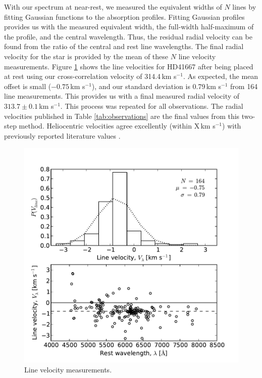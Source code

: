 \documentclass{emulateapj}
\begin{document}
With our spectrum at near-rest, we measured the equivalent widths of $N$ lines by fitting Gaussian functions to the absorption profiles. Fitting Gaussian profiles provides us with the measured equivalent width, the full-width half-maximum of the profile, and the central wavelength. Thus, the residual radial velocity can be found from the ratio of the central and rest line wavelengths. The final radial velocity for the star is provided by the mean of these $N$ line velocity measurements. Figure \ref{fig:line-velocities} shows the line velocities for HD41667 after  being placed at rest using our cross-correlation velocity of 314.4\,km s$^{-1}$. As expected, the mean offset is small ($-0.75$\,km s$^{-1}$), and our standard deviation is 0.79\,km s$^{-1}$ from 164 line measurements. This provides us with a final measured radial velocity of $313.7 \pm 0.1$\,km s$^{-1}$. This process was repeated for all observations. The radial velocities published in Table \ref{tab:observations} are the final values from this two-step method. Heliocentric velocities agree excellently (within X\,km s$^{-1}$) with previously reported literature values \citep{williams;et-al_2011,wylie-de-boer;et-al_2012}.

\begin{figure}[h]
	\includegraphics[width=\columnwidth]{./figures/line-velocity.pdf}
	\caption{Line velocity measurements.}
	\label{fig:line-velocities}
\end{figure}
\end{document}
